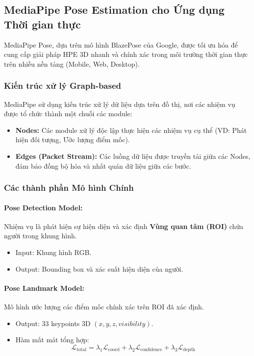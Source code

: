 \subsection{MediaPipe Pose Estimation cho Ứng dụng Thời gian thực}

MediaPipe Pose, dựa trên mô hình BlazePose của Google, được tối ưu hóa để cung cấp giải pháp HPE 3D nhanh và chính xác trong môi trường thời gian thực trên nhiều nền tảng (Mobile, Web, Desktop).

\subsubsection{Kiến trúc xử lý Graph-based}

MediaPipe sử dụng kiến trúc xử lý dữ liệu dựa trên đồ thị, nơi các nhiệm vụ được tổ chức thành một chuỗi các module:
\begin{itemize}
    \item \textbf{Nodes:} Các module xử lý độc lập thực hiện các nhiệm vụ cụ thể (VD: Phát hiện đối tượng, Ước lượng điểm mốc).
    \item \textbf{Edges (Packet Stream):} Các luồng dữ liệu được truyền tải giữa các Nodes, đảm bảo đồng bộ hóa và nhất quán dữ liệu giữa các bước.
\end{itemize}

\subsubsection{Các thành phần Mô hình Chính}

\paragraph{Pose Detection Model:} Nhiệm vụ là phát hiện sự hiện diện và xác định \textbf{Vùng quan tâm (ROI)} chứa người trong khung hình.
\begin{itemize}
    \item Input: Khung hình RGB.
    \item Output: Bounding box và xác suất hiện diện của người.
\end{itemize}

\paragraph{Pose Landmark Model:} Mô hình ước lượng các điểm mốc chính xác trên ROI đã xác định.
\begin{itemize}
    \item Output: 33 keypoints 3D $(x, y, z, visibility)$.
    \item Hàm mất mát tổng hợp:
    \begin{equation}
    \mathcal{L}_{\text{total}} = \lambda_1 \mathcal{L}_{\text{coord}} + \lambda_2 \mathcal{L}_{\text{confidence}} + \lambda_3 \mathcal{L}_{\text{depth}}
    \end{equation}
\end{itemize}

